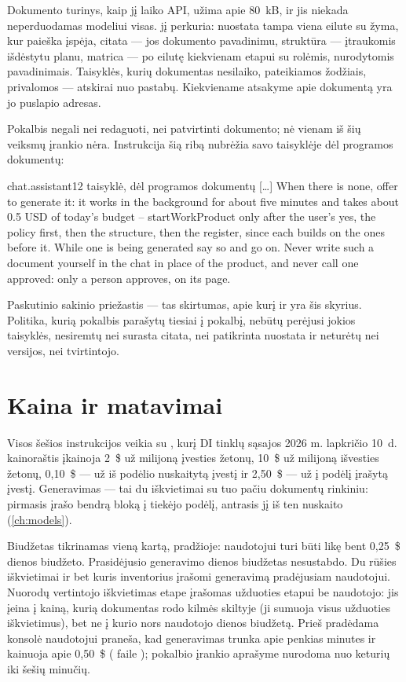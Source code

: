 Dokumento turinys, kaip jį laiko API, užima apie 80~kB, ir jis niekada neperduodamas modeliui
visas.  jį perkuria: nuostata tampa viena eilute su žyma, kur paieška
įspėja, citata --- jos dokumento pavadinimu, struktūra --- įtraukomis išdėstytu planu, matrica
--- po eilutę kiekvienam etapui su rolėmis, nurodytomis pavadinimais. Taisyklės, kurių
dokumentas nesilaiko, pateikiamos žodžiais, privalomos --- atskirai nuo pastabų. Kiekviename
atsakyme apie dokumentą yra jo puslapio adresas.

Pokalbis negali nei redaguoti, nei patvirtinti dokumento; nė vienam iš šių veiksmų įrankio
nėra. Instrukcija  šią ribą nubrėžia savo taisyklėje dėl programos
dokumentų:

\begin{promptexcerpt}{chat.assistant}{12 taisyklė, dėl programos dokumentų}
[…]
When there is none, offer to generate it: it works in the background for about five minutes and takes about 0.5 USD of today's budget – startWorkProduct only after the user's yes, the policy first, then the structure, then the register, since each builds on the ones before it. While one is being generated say so and go on. Never write such a document yourself in the chat in place of the product, and never call one approved: only a person approves, on its page.
\end{promptexcerpt}

Paskutinio sakinio priežastis --- tas skirtumas, apie kurį ir yra šis skyrius. Politika, kurią
pokalbis parašytų tiesiai į pokalbį, nebūtų perėjusi jokios taisyklės, nesiremtų nei surasta
citata, nei patikrinta nuostata ir neturėtų nei versijos, nei tvirtintojo.


\section{Kaina ir matavimai}\label{sec:programme:cost}

Visos šešios instrukcijos veikia su , kurį DI tinklų sąsajos 2026 m.
lapkričio 10~d. kainoraštis įkainoja 2~\$ už milijoną įvesties žetonų, 10~\$ už milijoną
išvesties žetonų, 0,10~\$ --- už iš podėlio nuskaitytą įvestį ir 2,50~\$ --- už į podėlį
įrašytą įvestį. Generavimas --- tai du iškvietimai su tuo pačiu dokumentų rinkiniu: pirmasis
įrašo bendrą bloką į tiekėjo podėlį, antrasis jį iš ten nuskaito (\cref{ch:models}).

Biudžetas tikrinamas vieną kartą, pradžioje: naudotojui turi būti likę bent 0,25~\$ dienos biudžeto.
Prasidėjusio generavimo dienos biudžetas nesustabdo. Du rūšies iškvietimai ir bet kuris
inventorius įrašomi generavimą pradėjusiam naudotojui. Nuorodų vertintojo iškvietimas etape
 įrašomas užduoties etapui be naudotojo: jis įeina į kainą, kurią dokumentas
rodo kilmės skiltyje (ji sumuoja visus užduoties iškvietimus), bet ne į kurio nors naudotojo
dienos biudžetą. Prieš pradėdama konsolė naudotojui praneša, kad generavimas trunka apie
penkias minutes ir kainuoja apie 0,50~\$ ( faile
); pokalbio įrankio aprašyme nurodoma nuo keturių iki šešių
minučių.

